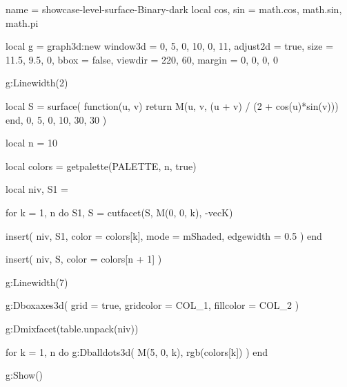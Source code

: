 \documentclass[theme = dark]{tutodoc}
\newcommand{\PALETTE}{Binary}
\begin{document}
\vfill

\begin{luadraw}{name = showcase-level-surface-\PALETTE-dark}
local cos, sin = math.cos, math.sin, math.pi

local g = graph3d:new{
  window3d = {0, 5, 0, 10, 0, 11},
  adjust2d = true,
  size     = {11.5, 9.5, 0},
  bbox     = false,
  viewdir  = {220, 60},
  margin   = {0, 0, 0, 0}
}

g:Linewidth(2)

local S = surface(
  function(u, v)
    return M(u, v, (u + v) / (2 + cos(u)*sin(v)))
  end,
  0, 5, 0, 10,
  {30, 30}
)

local n = 10

local colors = getpalette(PALETTE, n, true)

local niv, S1 = {}

for k = 1, n do
  S1, S = cutfacet(S, {M(0, 0, k), -vecK})

  insert(
    niv,
    {
      S1,
      {
        color     = colors[k],
        mode      = mShaded,
        edgewidth = 0.5
      }
    }
  )
end

insert(
  niv,
  {
    S,
    {color = colors[n + 1]}
  }
)

g:Linewidth(7)

g:Dboxaxes3d({
  grid      = true,
  gridcolor = COL_1,
  fillcolor = COL_2
})

g:Dmixfacet(table.unpack(niv))

for k = 1, n do
  g:Dballdots3d(
    M(5, 0, k),
    rgb(colors[k])
  )
end

g:Show()
\end{luadraw}
\end{document}
